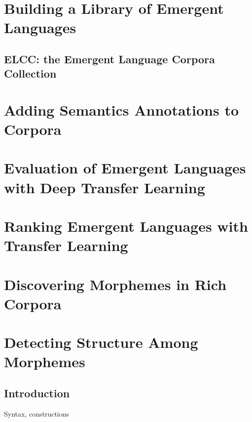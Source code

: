 \newpage
\tableofcontents*



\chapter{Building a Library of Emergent Languages}

\section{ELCC: the Emergent Language Corpora Collection }


\chapter{Adding Semantics Annotations to Corpora }
\unskip\label{ch:rich-corpora}


\chapter{Evaluation of Emergent Languages with Deep Transfer Learning}



\chapter{Ranking Emergent Languages with Transfer Learning }
\unskip\label{ch:xferbench-analysis}



\chapter{Discovering Morphemes in Rich Corpora }
\unskip\label{ch:universals}



\chapter{Detecting Structure Among Morphemes}
\unskip\label{ch:syntax}

\section{Introduction}

Syntax, constructions

